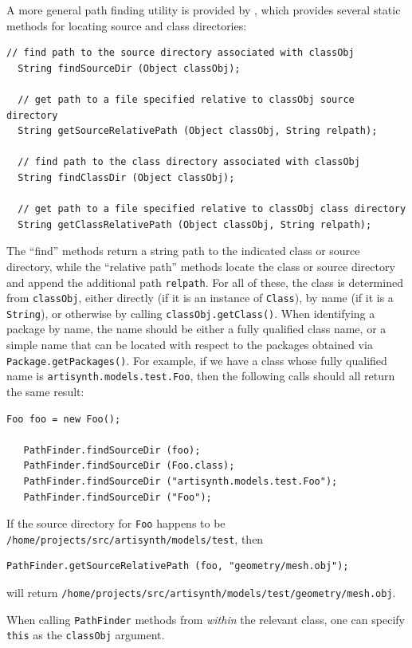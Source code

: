 A more general path finding utility is provided by
, which provides several static
methods for locating source and class directories:
\begin{lstlisting}[]
  // find path to the source directory associated with classObj
  String findSourceDir (Object classObj);

  // get path to a file specified relative to classObj source directory
  String getSourceRelativePath (Object classObj, String relpath);

  // find path to the class directory associated with classObj
  String findClassDir (Object classObj);

  // get path to a file specified relative to classObj class directory
  String getClassRelativePath (Object classObj, String relpath);
\end{lstlisting}
%
The ``find'' methods return a string path to the indicated class or
source directory, while the ``relative path'' methods locate the class
or source directory and append
the additional path {\tt relpath}.  For all of these, the class is
determined from {\tt classObj}, either directly (if it is an instance
of {\tt Class}), by name (if it is a {\tt String}), or otherwise by
calling {\tt classObj.getClass()}. When identifying a package by name,
the name should be either a fully qualified class name, or a simple
name that can be located with respect to the packages obtained via
{\tt Package.getPackages()}. For example, if we have a class whose
fully qualified name is {\tt artisynth.models.test.Foo}, then the
following calls should all return the same result:
%
\begin{lstlisting}[]
   Foo foo = new Foo();

   PathFinder.findSourceDir (foo);
   PathFinder.findSourceDir (Foo.class);
   PathFinder.findSourceDir ("artisynth.models.test.Foo");
   PathFinder.findSourceDir ("Foo");
\end{lstlisting}
%
If the source directory for {\tt Foo} happens to be {\tt
/home/projects/src/artisynth/models/test}, then
%
\begin{lstlisting}[]
   PathFinder.getSourceRelativePath (foo, "geometry/mesh.obj");
\end{lstlisting}
%
will return
{\tt /home/projects/src/artisynth/models/test/geometry/mesh.obj}.

\begin{sideblock}
When calling {\tt PathFinder} methods from {\it within} the relevant
class, one can specify {\tt this} as the {\tt classObj} argument.
\end{sideblock}


